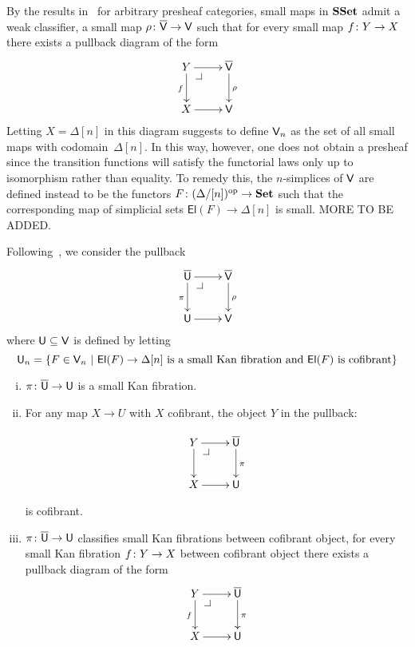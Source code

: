 \documentclass[reqno,10pt,a4paper,oneside,draft]{amsart}
\begin{document}
By the results in~\cite{hofmann-streicher-universes} for arbitrary presheaf categories, small maps in
 $\mathbf{SSet}$ admit a weak classifier, \ie a small map $\rho \colon \overline{\mathsf{V}} \to \mathsf{V}$ such 
that for every small map $f \colon Y \to X$ there exists  a pullback diagram of the form
\[
\xymatrix{
Y \ar[r] \ar[d]_f \drpullback  & \VV \ar[d]^\rho \\
X \ar[r] & \V }
\]
Letting $X = \Delta[n]$ in this diagram suggests to define $\mathsf{V}_n$ as the set of all small maps with codomain~$\Delta[n]$. In this way, however, one does not obtain a presheaf since the transition functions
will satisfy the functorial laws only up to isomorphism rather than equality. To remedy this, the $n$-simplices of $\mathsf{V}$ are defined instead to be the functors $F \colon (\Delta/[n])^{\operatorname{op}} \to \mathbf{Set}$ such that 
the corresponding map of simplicial sets $ \mathsf{El}(F) \to \Delta[n]$ is small. MORE TO BE ADDED.

\medskip

Following~\cite{cisinski-univalence,voevodsky-simplicial-model}, we consider the pullback 
\[
\xymatrix{
\UU \ar[r] \ar[d]_\pi \drpullback  & \VV \ar[d]^\rho \\
\U \ar[r] & \V }
\]
where $\mathsf{U} \subseteq \mathsf{V}$ is defined by letting 
\[
\mathsf{U}_n = \{ F \in \mathsf{V}_n \ | \ \mathsf{El}(F) \to \Delta[n] \text{ is a small Kan fibration and $\mathsf{El}(F)$ is cofibrant} \}
\]


\begin{proposition} \label{thm:universe-u}  \hfill 
\begin{enumerate}[(i)] 
\item $\pi \colon \overline{\mathsf{U}} \to \mathsf{U}$ is a small Kan fibration.
\item For any map $X \rightarrow U$ with $X$ cofibrant, the object $Y$ in the pullback:

\[
\xymatrix{
Y \ar[r] \ar[d] \drpullback & \UU \ar[d]^\pi \\
X \ar[r] & \U }
\]

is cofibrant.

\item $\pi \colon \overline{\mathsf{U}} \to \mathsf{U}$ classifies small Kan fibrations between cofibrant object, \ie 
for every small Kan fibration $f \colon Y \to X$ between cofibrant object there exists a pullback diagram of the form
\[
\xymatrix{
Y \ar[r] \ar[d]_f \drpullback & \UU \ar[d]^\pi \\
X \ar[r] & \U }
\]

\end{enumerate}
\end{proposition}
\end{document}
